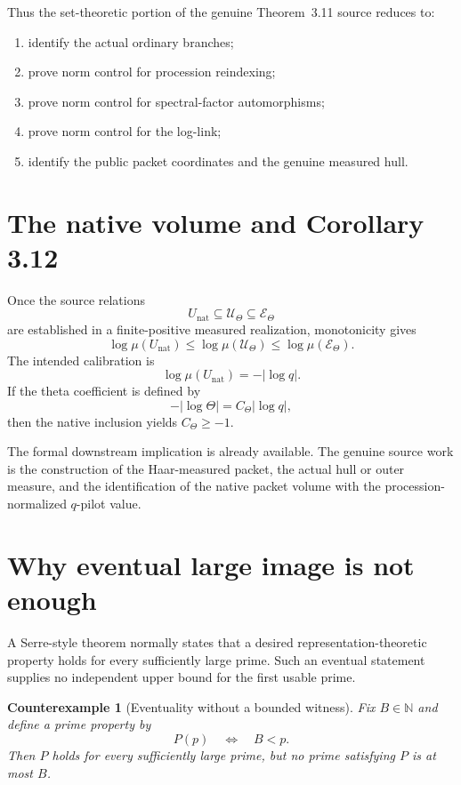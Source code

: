 \documentclass[11pt]{amsart}
\newtheorem{counterexample}[theorem]{Counterexample}
\theoremstyle{definition}
\theoremstyle{remark}
\newcommand{\N}{\mathbb N}
\newcommand{\ThetaOut}{\mathcal U_{\Theta}}
\newcommand{\ThetaEnv}{\mathcal E_{\Theta}}
\begin{document}
Thus the set-theoretic portion of the genuine Theorem~3.11 source reduces to:
\begin{enumerate}[label=(\alph*)]
\item identify the actual ordinary branches;
\item prove norm control for procession reindexing;
\item prove norm control for spectral-factor automorphisms;
\item prove norm control for the log-link;
\item identify the public packet coordinates and the genuine measured hull.
\end{enumerate}

\section{The native volume and Corollary 3.12}

Once the source relations
\[
 U_{\mathrm{nat}}\subseteq\ThetaOut\subseteq\ThetaEnv
\]
are established in a finite-positive measured realization, monotonicity gives
\[
 \log\mu(U_{\mathrm{nat}})
 \le \log\mu(\ThetaOut)
 \le \log\mu(\ThetaEnv).
\]
The intended calibration is
\[
 \log\mu(U_{\mathrm{nat}})=-|\log q|.
\]
If the theta coefficient is defined by
\[
 -|\log\Theta|=C_{\Theta}|\log q|,
\]
then the native inclusion yields $C_{\Theta}\ge-1$.

The formal downstream implication is already available.  The genuine source
work is the construction of the Haar-measured packet, the actual hull or outer
measure, and the identification of the native packet volume with the
procession-normalized $q$-pilot value.

\section{Why eventual large image is not enough}

A Serre-style theorem normally states that a desired representation-theoretic
property holds for every sufficiently large prime.  Such an eventual statement
supplies no independent upper bound for the first usable prime.

\begin{counterexample}[Eventuality without a bounded witness]
Fix $B\in\N$ and define a prime property by
\[
 P(p)\quad\Longleftrightarrow\quad B<p.
\]
Then $P$ holds for every sufficiently large prime, but no prime satisfying
$P$ is at most $B$.
\end{counterexample}
\end{document}
